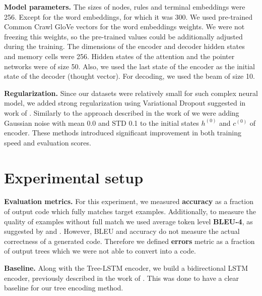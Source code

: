 \textbf{Model parameters.} The sizes of nodes, rules and terminal embeddings were 256. Except for the word embeddings, for which it was 300. We used pre-trained Common Crawl GloVe vectors \parencite{pennington2014} for the word embeddings weights. We were not freezing this weights, so the pre-trained values could be additionally adjusted during the training. The dimensions of the encoder and decoder hidden states and memory cells were 256. Hidden states of the attention and the pointer networks were of size 50. Also, we used the last state of the encoder as the initial state of the decoder (thought vector). For decoding, we used the beam of size 10.

\textbf{Regularization.} Since our datasets were relatively small for such complex neural model, we added strong regularization using Variational Dropout suggested in work of \cite{Gal2016}. Similarly to the approach described in the work of \cite{zimmermann2012} we were adding Gaussian noise with mean 0.0 and STD 0.1 to the initial states $h^{(0)}$ and $c^{(0)}$ of encoder. These methods introduced significant improvement in both training speed and evaluation scores.

\section{Experimental setup} \label{exp_setup}

\textbf{Evaluation metrics.} For this experiment, we measured \textbf{accuracy} as a fraction of output code which fully matches target examples. Additionally, to measure the quality of examples without full match we used average token level \textbf{BLEU-4}, as suggested by \cite{Ling2016} and \cite{Yin2017}. However, BLEU and accuracy do not measure the actual correctness of a generated code. Therefore we defined  \textbf{errors} metric as a fraction of output trees which we were not able to convert into a code.

\textbf{Baseline.} Along with the Tree-LSTM encoder, we build a bidirectional LSTM encoder, previously described in the work of \cite{Yin2017}. This was done to have a clear baseline for our tree encoding method. 

